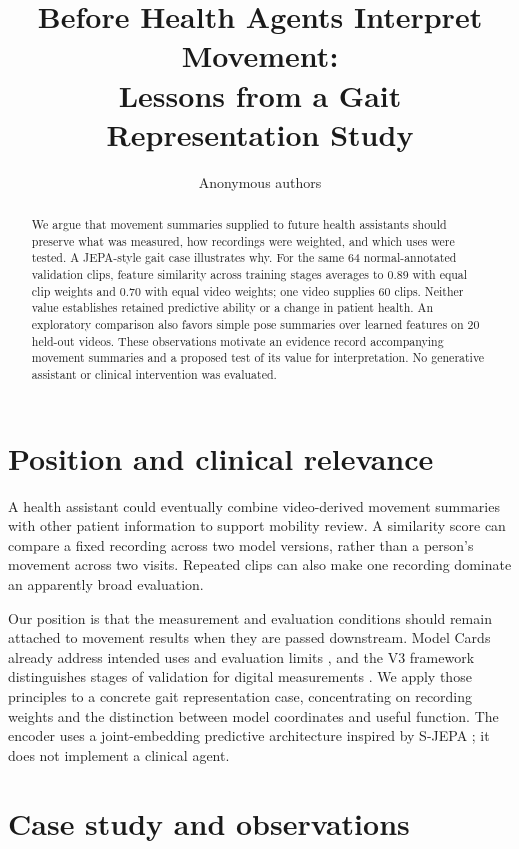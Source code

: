 \documentclass{article}
\title{Before Health Agents Interpret Movement:\\Lessons from a Gait Representation Study}
\author{Anonymous authors}
\begin{document}
\maketitle

\begin{abstract}
We argue that movement summaries supplied to future health assistants should preserve what was measured, how recordings were weighted, and which uses were tested. A JEPA-style gait case illustrates why. For the same 64 normal-annotated validation clips, feature similarity across training stages averages to 0.89 with equal clip weights and 0.70 with equal video weights; one video supplies 60 clips. Neither value establishes retained predictive ability or a change in patient health. An exploratory comparison also favors simple pose summaries over learned features on 20 held-out videos. These observations motivate an evidence record accompanying movement summaries and a proposed test of its value for interpretation. No generative assistant or clinical intervention was evaluated.
\end{abstract}

\section{Position and clinical relevance}

A health assistant could eventually combine video-derived movement summaries with other patient information to support mobility review. A similarity score can compare a fixed recording across two model versions, rather than a person's movement across two visits. Repeated clips can also make one recording dominate an apparently broad evaluation.

Our position is that the measurement and evaluation conditions should remain attached to movement results when they are passed downstream. Model Cards already address intended uses and evaluation limits \citep{mitchell2019modelcards}, and the V3 framework distinguishes stages of validation for digital measurements \citep{goldsack2020v3}. We apply those principles to a concrete gait representation case, concentrating on recording weights and the distinction between model coordinates and useful function. The encoder uses a joint-embedding predictive architecture inspired by S-JEPA \citep{abdelfattah2024sjepa}; it does not implement a clinical agent.

\section{Case study and observations}
\end{document}
